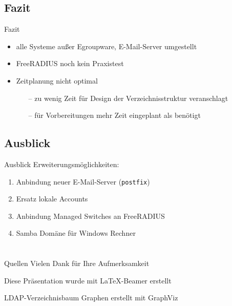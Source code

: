\documentclass[presentation,svgnames,12pt]{beamer}
\begin{document}
\subsection{Fazit}
\begin{frame}{Fazit}
\begin{itemize}
	\item alle Systeme außer Egroupware, E-Mail-Server umgestellt
	\item FreeRADIUS noch kein Praxistest
	\item Zeitplanung nicht optimal
	\vspace{6pt}
	\begin{itemize}
		\item[--] zu wenig Zeit für Design der Verzeichnisstruktur veranschlagt
		\item[--] für Vorbereitungen mehr Zeit eingeplant als benötigt
	\end{itemize}
\end{itemize}
\end{frame}


\subsection{Ausblick}
\begin{frame}{Ausblick}
Erweiterungsmöglichkeiten:
\vspace{6pt}
	\begin{enumerate}
		\item Anbindung neuer E-Mail-Server (\texttt{postfix})
		\item Ersatz lokale Accounts
		\item Anbindung Managed Switches an FreeRADIUS
		\item Samba Domäne für Windows Rechner
	\end{enumerate}
\end{frame}


\section{} %
\begin{frame}{Quellen}
	Vielen Dank für Ihre Aufmerksamkeit
	
	\medskip
	\medskip Diese Präsentation wurde mit \LaTeX{}-Beamer erstellt
	
	LDAP-Verzeichnisbaum Graphen erstellt mit GraphViz
\end{frame}
\end{document}
